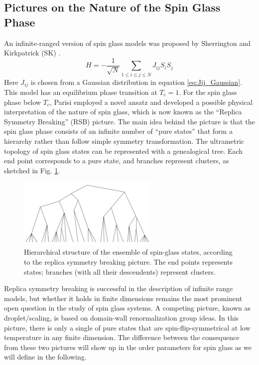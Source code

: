 \subsection{Pictures on the Nature of the Spin Glass Phase}
\label{sec:meanfield-model}

An infinite-ranged version of spin glass models 
was proposed by Sherrington and Kirkpatrick (SK) \cite{Sherrington-Kirkpatrick-1975,Sherrington-Kirkpatrick1978}.
\begin{equation}
  \label{eq:SK}
  H=-\frac{1}{\sqrt{N}}\sum_{1\le i\le j\le N}J_{ij}S_iS_j
\end{equation}
Here $J_{ij}$ is chosen from a Gaussian distribution in equation 
\ref{eq:Jij_Gaussian}.
This model has an equilibrium phase transition at $T_c = 1$.
For the spin glass phase below $T_c$, Parisi\cite{Parisi1980,Parisi-1980b,Parisi-1980a} employed a novel ansatz and 
developed a  possible physical interpretation of the nature of spin glass, 
which is now known as the ``Replica Symmetry Breaking'' (RSB) picture. The main
idea behind the picture is that the spin glass phase consists of an infinite 
number of ``pure states'' that form a hierarchy rather than follow simple symmetry
transformation. 
The ultrametric topology of spin glass states can be represented with a 
genealogical tree. Each end point corresponds to a pure state, and branches 
represent clusters, as sketched in Fig. \ref{fig:TreeRSB}. 


\begin{figure}[!h]
  \label{fig:TreeRSB}
  \centering
  \includegraphics[width=0.6\textwidth]{img/TreeRSB.png}
  \caption{Hierarchical structure of the ensemble of spin-glass states, according
to the replica symmetry breaking picture. The end points represents states; branches (with all their descendents)
represent clusters.}
\end{figure}


Replica symmetry breaking is successful in the description of infinite range models, but whether it 
holds in finite dimensions remains the most prominent open question in the study of spin glass systems. 
A competing picture, known as droplet/scaling\cite{Fisher-Huse-1987,Fisher-Huse-1988}, 
is based on domain-wall 
renormalization group ideas. In this picture, there is only a single of
pure states that are spin-flip-symmetrical at low temperature in any finite 
dimension. The difference between the consequence from these two pictures 
will show up in the order parameters for spin glass as we will define in the following.

